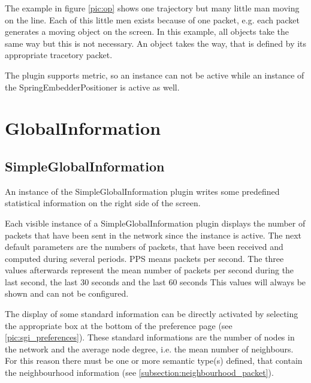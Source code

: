 The example in figure \ref{pic:op} shows one trajectory but many little man moving on the line. Each of this 
little men exists because of one packet, e.g. each packet generates a moving object on the screen. In this
example, all objects take the same way but this is not necessary. An object takes the way, that is defined
by its appropriate tracetory packet.

The plugin supports metric, so an instance can not be active while an instance of the SpringEmbedderPositioner is
active as well.

\newpage
\section{GlobalInformation}

\subsection{SimpleGlobalInformation}
\label{subsection:simpleglobalinformation}

An instance of the SimpleGlobalInformation plugin writes some predefined statistical information on the right
side of the screen.

Each visible instance of a SimpleGlobalInformation plugin displays the number of packets that have been sent
in the network since the instance is active. The next default parameters are the numbers of packets, that have been
received and computed during several periods. PPS means packets per second. The three values afterwards
represent the mean number of packets per second during the last second, the last 30 seconds and the last 60 seconds
This values will always be shown and can not be configured.

The display of some standard information can be directly activated by selecting the appropriate box at the bottom
of the preference page (see \ref{pic:sgi_preferences}). These standard informations are the number of nodes in the
network and the average node degree, i.e. the mean number of neighbours. For this reason there must be one or more semantic
type(s) defined, that contain the neighbourhood information (see \ref{subsection:neighbourhood_packet}).

